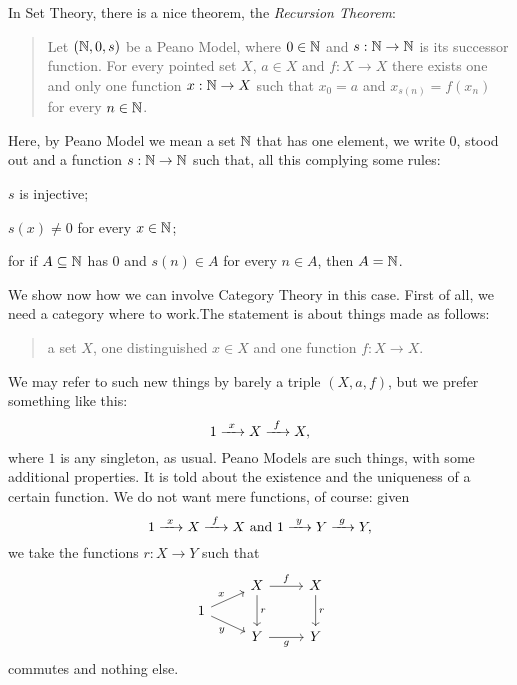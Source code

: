 \begin{example}[Recursion]\label{example:Recursion}
  In Set Theory, there is a nice theorem, the {\em Recursion Theorem}:
  \begin{quotation}
    Let \((\mathbb N, 0, s)\) be a Peano Model, where
    \(0 \in \mathbb N\) and \(s : \mathbb N \to \mathbb N\) is its
    successor function. For every pointed set \(X\), \(a \in X\) and
    \(f : X \to X\) there exists one and only one function
    \(x : \mathbb N \to X\) such that \(x_0 = a\) and
    \(x_{s(n)} = f(x_n)\) for every \(n \in \mathbb N\).
  \end{quotation}
  Here, by Peano Model we mean a set \(\mathbb N\) that has one
  element, we write \(0\), stood out and a function
  \(s : \mathbb N \to \mathbb N\) such that, all this complying some
  rules:
  \begin{tcbenum}
  \item \(s\) is injective;
  \item \(s(x) \ne 0\) for every \(x \in \mathbb N\);
  \item for if \(A \subseteq \mathbb N\) has \(0\) and \(s(n) \in A\) for every
    \(n \in A\), then \(A = \mathbb N\).
  \end{tcbenum}
  We show now how we can involve Category Theory in this case. First
  of all, we need a category where to work.\newline The statement is about
  things made as follows:
  \begin{quotation}
    a set \(X\), one distinguished \(x \in X\) and one function
    \(f : X \to X\).
  \end{quotation}
    We may refer to
  such new things by barely a triple \((X, a, f)\), but we prefer
  something like this:
  \[1 \xrightarrow{\ x\ } X \xrightarrow{\ f\ } X ,\] where \(1\) is any singleton, as
  usual. Peano Models are such things, with some additional
  properties. It is told about the existence and the uniqueness of a
  certain function. We do not want mere functions, of course: given
  \[1 \xrightarrow{\ x\ } X \xrightarrow{\ f\ } X \text{ and } 1 \xrightarrow{\ y\ } Y \xrightarrow{\ g\ } Y
    ,\] we take the functions \(r : X \to Y\) such that
  \[\begin{tikzcd}[row sep=tiny]
      & X \ar["f", r] \ar["r", dd] & X \ar["r", dd] \\
      1 \ar["x", ur] \ar["y", dr, swap] \\
      & Y \ar["g", r, swap] & Y
    \end{tikzcd}\] commutes and nothing else. 
\end{example}
